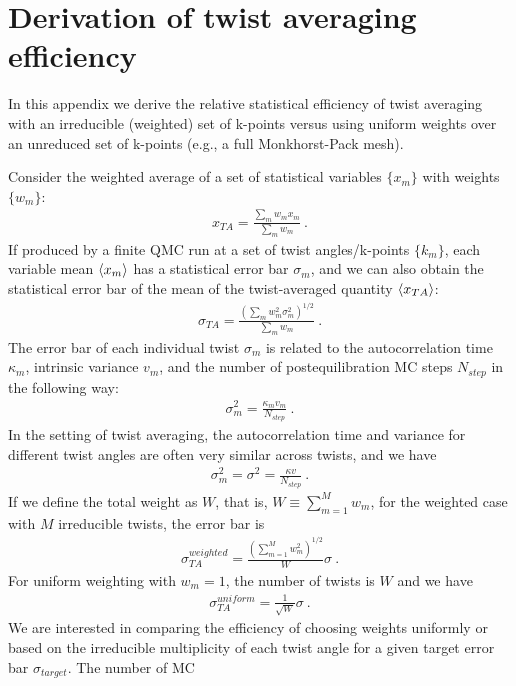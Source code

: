 \chapter{Derivation of twist averaging efficiency}
\label{sec:app_ta_efficiency}
In this appendix we derive the relative statistical efficiency of 
twist averaging with an irreducible (weighted) set of k-points 
versus using uniform weights over an unreduced set of k-points 
(e.g., a full Monkhorst-Pack mesh).

Consider the weighted average of a set of statistical variables 
$\{x_m\}$ with weights $\{w_m\}$:
\begin{align}
  x_{TA} = \frac{\sum_mw_mx_m}{\sum_mw_m}\:.
\end{align} 
If produced by a finite QMC run at a set of 
twist angles/k-points $\{k_m\}$, each variable mean $\langle x_m \rangle$ 
has a statistical error bar $\sigma_m$, and we can also obtain 
the statistical error bar of the mean of the twist-averaged 
quantity $\langle x_{TA} \rangle$:
\begin{align}
  \sigma_{TA} = \frac{\left(\sum_mw_m^2\sigma_m^2\right)^{1/2}}{\sum_mw_m}\:.
\end{align}
The error bar of each individual twist $\sigma_m$ is related to the 
autocorrelation time $\kappa_m$,  intrinsic variance $v_m$, and the number 
of postequilibration MC steps $N_{step}$ in the following way:
\begin{align}
  \sigma_m^2=\frac{\kappa_mv_m}{N_{step}}\:.
\end{align}
In the setting of twist averaging, the autocorrelation time and 
variance for different twist angles are often very similar across 
twists, and we have
\begin{align}
  \sigma_m^2=\sigma^2=\frac{\kappa v}{N_{step}}\:.
\end{align} 
If we define the total weight as $W$, that is, $W\equiv\sum_{m=1}^Mw_m$, 
for the weighted case with $M$ irreducible twists, the error bar is
\begin{align}
  \sigma_{TA}^{weighted}=\frac{\left(\sum_{m=1}^Mw_m^2\right)^{1/2}}{W}\sigma\:.
\end{align}
For uniform weighting with $w_m=1$, the number of twists is $W$ and 
we have
\begin{align}
  \sigma_{TA}^{uniform}=\frac{1}{\sqrt{W}}\sigma\:.
\end{align}
We are interested in comparing the efficiency of choosing weights 
uniformly or based on the irreducible multiplicity of each twist angle 
for a given target error bar $\sigma_{target}$.  The number of MC  
